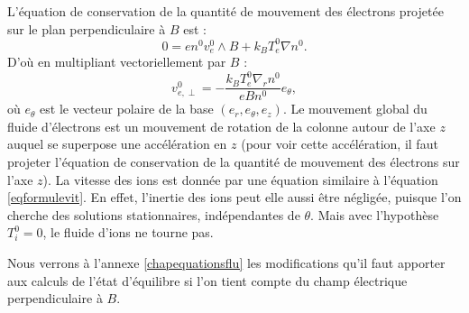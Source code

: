 \documentclass{book}
\begin{document}
L'\'equation de conservation  de la
quantit\'e de mouvement des \'electrons projet\'ee sur le plan
perpendiculaire \`a $B$ est :
\begin{equation}
0=en^0v_e^0\wedge B +k_B T_e^0\nabla n^0.
\end{equation}
D'o\`u en multipliant vectoriellement par $B$ :
\begin{equation}\label{eqformulevit}
v_{e,\perp}^0=-\frac{k_B T_e^0 \nabla_r n^0}{e B n^0} e_\theta,
\end{equation}
o\`u $e_\theta$ est le vecteur polaire de la base $(e_r,e_\theta,e_z)$.
Le mouvement global du fluide d'\'electrons
est un mouvement de rotation de la colonne autour de l'axe $z$ auquel
se superpose une acc\'el\'eration en $z$ (pour voir cette
acc\'el\'eration, il faut projeter  l'\'equation de conservation de la
quantit\'e de mouvement des \'electrons sur l'axe $z$).
La vitesse des ions est donn\'ee par une \'equation similaire \`a
l'\'equation \ref{eqformulevit}. En effet, l'inertie des ions peut
elle aussi \^etre n\'eglig\'ee, puisque l'on cherche des solutions
stationnaires, ind\'ependantes de $\theta$. Mais avec l'hypoth\`ese
$T_i^0=0$, le fluide d'ions ne tourne pas.

Nous verrons \`a l'annexe \ref{chapequationsflu} les modifications
qu'il faut apporter aux calculs de l'\'etat d'\'equilibre si l'on tient
compte du champ \'electrique perpendiculaire \`a $B$.
\end{document}
